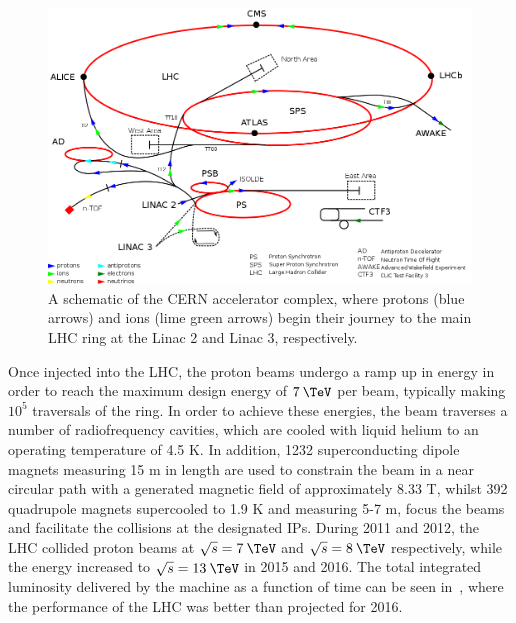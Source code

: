 \begin{figure}
  \centering
  \includegraphics[width=\textwidth]{figs/accelerator.png}
  \caption{A schematic of the CERN accelerator complex, where protons (blue arrows) and ions (lime green arrows) begin their journey to the main LHC ring at the Linac 2 and Linac 3, respectively.}
  \label{fig:accelerator}
\end{figure}

Once injected into the LHC, the proton beams undergo a ramp up in energy in order to reach the maximum design energy of $7\:\TeV$ per beam, typically making $10^5$ traversals of the ring. In order to achieve these energies, the beam traverses a number of radiofrequency cavities, which are cooled with liquid helium to an operating temperature of 4.5 K. In addition, 1232 superconducting dipole magnets measuring 15 m in length are used to constrain the beam in a near circular path with a generated magnetic field of approximately 8.33 T, whilst 392 quadrupole magnets supercooled to 1.9 K and measuring 5-7 m, focus the beams and facilitate the collisions at the designated IPs. During 2011 and 2012, the LHC collided proton beams at $\sqrt{s}=7\:\TeV$ and $\sqrt{s}=8\:\TeV$ respectively, while the energy increased to $\sqrt{s}=13\:\TeV$ in 2015 and 2016. The total integrated luminosity delivered by the machine as a function of time can be seen in~, where the performance of the LHC was better than projected for 2016.

